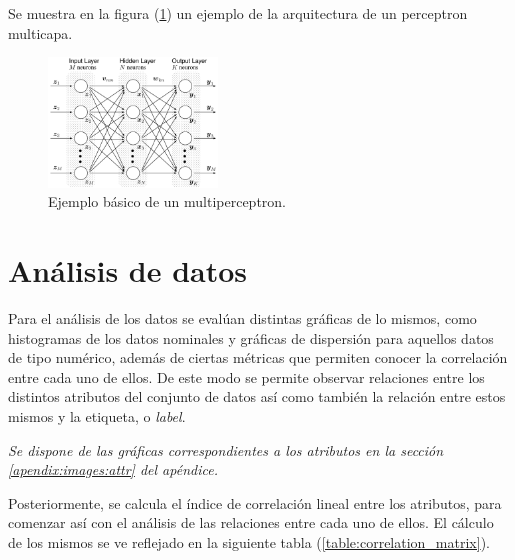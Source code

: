 \documentclass[osajnl,twocolumn,showpacs,superscriptaddress,10pt,floatfix]{revtex4-1} %
\begin{document}
Se muestra en la figura (\ref{figure:multiperceptron_example}) un ejemplo de la arquitectura de un perceptron multicapa.

\begin{figure}[H]
    \centering
    \includegraphics[width=0.4\textwidth]{theory/multiperceptron}
    \caption{Ejemplo básico de un multiperceptron.}
    \label{figure:multiperceptron_example}
\end{figure}

\section{Análisis de datos}

Para el análisis de los datos se evalúan distintas gráficas de lo mismos, como histogramas de los datos nominales y gráficas de dispersión para aquellos datos de tipo numérico, además de ciertas métricas que permiten conocer la correlación entre cada uno de ellos. De este modo se permite observar relaciones entre los distintos atributos del conjunto de datos así como también la relación entre estos mismos y la etiqueta, o \textit{label}.

\begin{flushright}
\textit{\footnotesize Se dispone de las gráficas correspondientes a los atributos en la sección \ref{apendix:images:attr} del apéndice.}
\end{flushright}

Posteriormente, se calcula el índice de correlación lineal entre los atributos, para comenzar así con el análisis de las relaciones entre cada uno de ellos. El cálculo de los mismos se ve reflejado en la siguiente tabla (\ref{table:correlation_matrix}). \\
\end{document}
